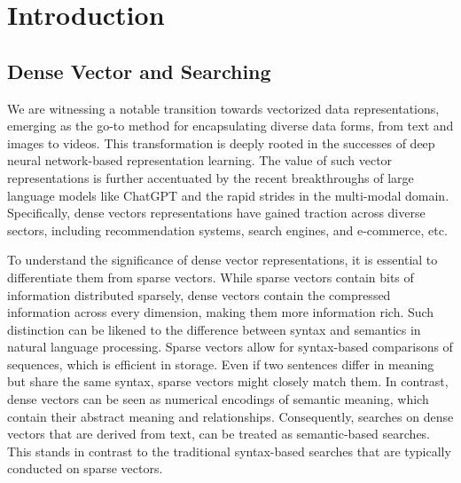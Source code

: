 \documentclass[11pt]{article}
\begin{document}


\section{Introduction}
\label{bolong_sec:intro}

\subsection{Dense Vector and Searching}

We are witnessing a notable transition towards vectorized data representations, emerging as the go-to method for encapsulating diverse data forms, from text and images to videos.  This transformation is deeply rooted in the successes of deep neural network-based representation learning. The value of such vector representations is further accentuated by the recent breakthroughs of large language models like ChatGPT and the rapid strides in the multi-modal domain. Specifically, dense vectors representations have gained traction across diverse sectors, including recommendation systems, search engines, and e-commerce, etc.  

To understand the significance of dense vector representations, it is essential to differentiate them from sparse vectors. While sparse vectors contain bits of information distributed sparsely, dense vectors contain the compressed information across every dimension, making them more information rich. Such distinction can be likened to the difference between syntax and semantics in natural language processing. Sparse vectors allow for syntax-based comparisons of sequences, which is efficient in storage. Even if two sentences differ in meaning but share the same syntax, sparse vectors might closely match them. In contrast, dense vectors can be seen as numerical encodings of semantic meaning, which contain their abstract meaning and relationships. Consequently, searches on dense vectors that are derived from text, can be treated as semantic-based searches. This stands in contrast to the traditional syntax-based searches that are typically conducted on sparse vectors.
\end{document}
